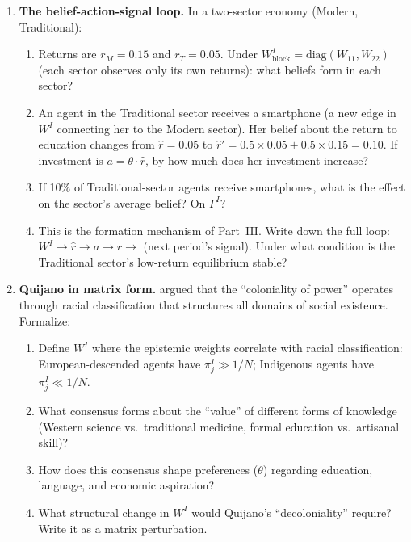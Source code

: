 \documentclass[../structural_economics_book.tex]{subfiles}
\begin{document}
\begin{enumerate}[label=\textbf{8.\arabic*}, leftmargin=3em]
\item \textbf{The belief-action-signal loop.} In a two-sector economy (Modern, Traditional):
\begin{enumerate}
\item Returns are $r_M = 0.15$ and $r_T = 0.05$. Under $W^I_{\text{block}} = \text{diag}(W_{11}, W_{22})$ (each sector observes only its own returns): what beliefs form in each sector?
\item An agent in the Traditional sector receives a smartphone (a new edge in $W^I$ connecting her to the Modern sector). Her belief about the return to education changes from $\hat{r} = 0.05$ to $\hat{r}' = 0.5 \times 0.05 + 0.5 \times 0.15 = 0.10$. If investment is $a = \theta \cdot \hat{r}$, by how much does her investment increase?
\item If 10\% of Traditional-sector agents receive smartphones, what is the effect on the sector's average belief? On $\Gamma^I$?
\item This is the formation mechanism of Part~III. Write down the full loop: $W^I \to \hat{r} \to a \to r \to$ (next period's signal). Under what condition is the Traditional sector's low-return equilibrium stable?
\end{enumerate}

\item \textbf{Quijano in matrix form.} \citet{quijano2000colonialidad,quijano2000colonialidadclasificacion} argued that the ``coloniality of power'' operates through racial classification that structures all domains of social existence. Formalize:
\begin{enumerate}
\item Define $W^I$ where the epistemic weights correlate with racial classification: European-descended agents have $\pi^I_j \gg 1/N$; Indigenous agents have $\pi^I_j \ll 1/N$.
\item What consensus forms about the ``value'' of different forms of knowledge (Western science vs.\ traditional medicine, formal education vs.\ artisanal skill)?
\item How does this consensus shape preferences ($\theta$) regarding education, language, and economic aspiration?
\item What structural change in $W^I$ would Quijano's ``decoloniality'' require? Write it as a matrix perturbation.
\end{enumerate}
\end{enumerate}


\newpage
\end{document}
